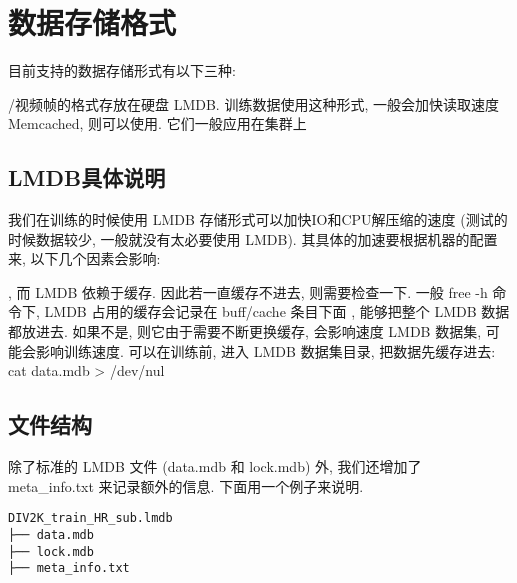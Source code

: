 \documentclass[../main.tex]{subfiles}
\begin{document}
\section{数据存储格式}\label{data_preparation:data_format}


目前支持的数据存储形式有以下三种:
\begin{enumerate}
/视频帧的格式存放在硬盘
 LMDB. 训练数据使用这种形式, 一般会加快读取速度
 Memcached, 则可以使用. 它们一般应用在集群上
\end{enumerate}

\subsection{LMDB具体说明}

我们在训练的时候使用 LMDB 存储形式可以加快IO和CPU解压缩的速度 (测试的时候数据较少, 一般就没有太必要使用 LMDB). 其具体的加速要根据机器的配置来, 以下几个因素会影响:
\begin{enumerate}
, 而 LMDB 依赖于缓存. 因此若一直缓存不进去, 则需要检查一下. 一般 free -h 命令下, LMDB 占用的缓存会记录在 buff/cache 条目下面
, 能够把整个 LMDB 数据都放进去. 如果不是, 则它由于需要不断更换缓存, 会影响速度
 LMDB 数据集, 可能会影响训练速度. 可以在训练前, 进入 LMDB 数据集目录, 把数据先缓存进去: cat data.mdb > /dev/nul
\end{enumerate}

\subsection{文件结构}

除了标准的 LMDB 文件 (data.mdb 和 lock.mdb) 外, 我们还增加了
 meta\_info.txt 来记录额外的信息. 下面用一个例子来说明.

\begin{verbatim}
DIV2K_train_HR_sub.lmdb
├── data.mdb
├── lock.mdb
├── meta_info.txt
\end{verbatim}

\end{document}
